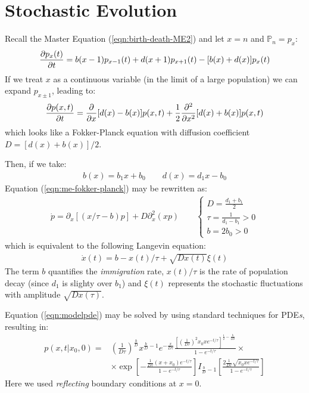 \documentclass[../../main.tex]{subfiles}
\begin{document}
\section{Stochastic Evolution} %
Recall the Master Equation (\ref{eqn:birth-death-ME2}) and let $x = n$ and $\mathbb{P}_n = p_x$:
\begin{align*}
    \pdv{p_x(t)}{t}=b(x-1) p_{x-1}(t)+d(x+1) p_{x+1}(t)-[b(x)+d(x)] p_{x}(t)
\end{align*}
If we treat $x$ as a continuous variable (in the limit of a large population) we can expand $p_{x\pm1}$, leading to:
\begin{align}\label{eqn:me-fokker-planck}
    \pdv{p(x,t)}{t} = \pdv{x} [d(x) - b(x)] p(x,t) + \frac{1}{2} \pdv[2]{x} [d(x) + b(x)] p(x,t) 
\end{align}
which looks like a Fokker-Planck equation with diffusion coefficient $D = [d(x) + b(x)]/2$.

Then, if we take:
\begin{align*}
    b(x) = b_1 x + b_0\qquad d(x) = d_1 x - b_0
\end{align*}
Equation (\ref{eqn:me-fokker-planck}) may be rewritten as:
\begin{align}\label{eqn:modelpde}
    \dot{p} = \partial_x[(x/\tau - b)p] + D\partial_x^2 (xp) \qquad \begin{cases}
        D = \frac{d_1 + b_1}{2}\\
        \tau = \frac{1}{d_1 - b_1} > 0\\
        b = 2b_0 > 0  
    \end{cases}
\end{align}
which is equivalent to the following Langevin equation:
\begin{align*}
    \dot{x}(t) = b - x(t)/\tau + \sqrt{D x(t)} \xi(t)
\end{align*}
The term $b$ quantifies the \textit{immigration} rate, $x(t)/\tau$ is the rate of population decay (since $d_1$ is slighty over $b_1$) and $\xi(t)$ represents the stochastic fluctuations with amplitude $\sqrt{D x(\tau)}$.

\medskip

Equation (\ref{eqn:modelpde}) may be solved by using standard techniques for PDE\textit{s}, resulting in:
\begin{align*}
    p(x, t | x_{0}, 0) = &\left(\frac{1}{D \tau}\right)^{\frac{b}{D}} x^{\frac{b}{D}-1} e^{-\frac{x}{D \tau}} \frac{\left[\left(\frac{1}{D \tau}\right)^{2} x_{0} x e^{-t / \tau}\right]^{\frac{1}{2}-\frac{b}{2 D}}}{1-e^{-t / \tau}} \times \\
    & \times \exp \left[-\frac{\frac{1}{D \tau}\left(x+x_{0}\right) e^{-t / \tau}}{1-e^{-t / \tau}}\right] I_{\frac{b}{D}-1}\left[\frac{2 \frac{1}{D \tau} \sqrt{x_{0} x e^{-t / \tau}}}{1-e^{-t / \tau}}\right]
\end{align*}
Here we used \textit{reflecting} boundary conditions at $x=0$.
\end{document}
